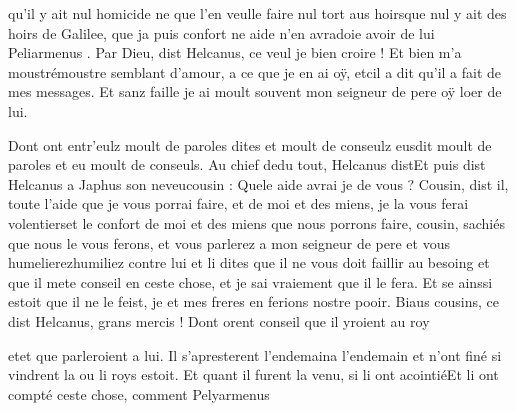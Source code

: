 \documentclass{article}
\begin{document}
\begin{pages}
                        qu’il y ait nul homicide ne que l’en veulle faire nul
                           tort aus hoirsque nul y ait des hoirs de Galilee, que ja puis confort ne
                     aide 
                        n’en avradoie avoir de lui Peliarmenus
                  .
               Par Dieu, dist Helcanus, ce veul je bien croire ! Et bien 
                     m’a moustrémoustre semblant d’amour, a ce que 
                     je en ai oÿ, etcil a dit qu’il a fait de mes messages. Et sanz faille je ai moult souvent mon seigneur de pere oÿ loer de lui.
               
                  Dont ont entr’eulz 
                        moult de paroles dites et moult de conseulz eusdit moult de paroles et eu moult de conseuls. Au chief 
                        dedu tout, Helcanus distEt puis dist Helcanus a Japhus son 
                  neveucousin : Quele aide avrai je de vous ?
               Cousin, dist il, toute l’aide 
                     que je vous porrai faire, et de moi et des miens, je la
                        vous ferai volentierset le confort de moi et des miens que nous porrons faire, cousin,
                        sachiés que nous le vous ferons, et vous parlerez a mon seigneur de
                     pere et vous 
                     humelierezhumiliez contre lui et li dites que il ne vous
                     doit faillir au besoing et que il mete conseil en ceste chose, et je sai
                  vraiement que il le fera. Et se ainssi estoit que il ne le feist, je et mes freres
                  en ferions nostre pooir.
               Biaus cousins, 
                     ce dist Helcanus, grans mercis
               ! \pend
            \pstart Dont orent conseil que il yroient au roy
               
                  etet que parleroient a lui. Il s’apresterent 
                  l’endemaina l'endemain et 
                  n’ont finé si vindrent la ou li roys estoit. 
                  Et quant il furent la venu, si li ont acointiéEt li ont compté
               ceste chose, comment Pelyarmenus
               

\end{pages}
\end{document}
